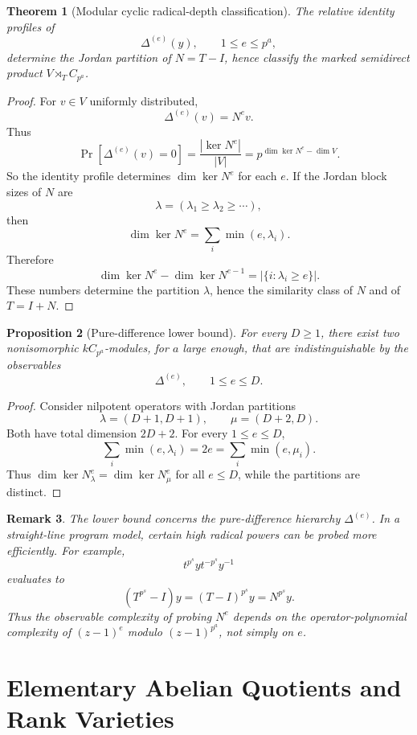 \documentclass[11pt]{article}
\newtheorem{theorem}{Theorem}[section]
\newtheorem{proposition}[theorem]{Proposition}
\newtheorem{remark}[theorem]{Remark}
\begin{document}
\begin{theorem}[Modular cyclic radical-depth classification]
The relative identity profiles of
\[
\Delta^{(e)}(y),
\qquad
1\le e\le p^a,
\]
determine the Jordan partition of $N=T-I$, hence classify the marked semidirect product $V\rtimes_T C_{p^a}$.
\end{theorem}

\begin{proof}
For $v\in V$ uniformly distributed,
\[
\Delta^{(e)}(v)=N^ev.
\]
Thus
\[
\Pr[\Delta^{(e)}(v)=0]
=
\frac{|\ker N^e|}{|V|}
=
p^{\dim\ker N^e-\dim V}.
\]
So the identity profile determines $\dim\ker N^e$ for each $e$. If the Jordan block sizes of $N$ are
\[
\lambda=(\lambda_1\ge \lambda_2\ge\cdots),
\]
then
\[
\dim\ker N^e=\sum_i \min(e,\lambda_i).
\]
Therefore
\[
\dim\ker N^e-\dim\ker N^{e-1}
=
|\{i:\lambda_i\ge e\}|.
\]
These numbers determine the partition $\lambda$, hence the similarity class of $N$ and of $T=I+N$.
\end{proof}

\begin{proposition}[Pure-difference lower bound]
For every $D\ge1$, there exist two nonisomorphic $kC_{p^a}$-modules, for $a$ large enough, that are indistinguishable by the observables
\[
\Delta^{(e)},\qquad 1\le e\le D.
\]
\end{proposition}

\begin{proof}
Consider nilpotent operators with Jordan partitions
\[
\lambda=(D+1,D+1),
\qquad
\mu=(D+2,D).
\]
Both have total dimension $2D+2$. For every $1\le e\le D$,
\[
\sum_i\min(e,\lambda_i)=2e=\sum_i\min(e,\mu_i).
\]
Thus $\dim\ker N_\lambda^e=\dim\ker N_\mu^e$ for all $e\le D$, while the partitions are distinct.
\end{proof}

\begin{remark}
The lower bound concerns the pure-difference hierarchy $\Delta^{(e)}$. In a straight-line program model, certain high radical powers can be probed more efficiently. For example,
\[
t^{p^s}yt^{-p^s}y^{-1}
\]
evaluates to
\[
(T^{p^s}-I)y=(T-I)^{p^s}y=N^{p^s}y.
\]
Thus the observable complexity of probing $N^e$ depends on the operator-polynomial complexity of $(z-1)^e$ modulo $(z-1)^{p^a}$, not simply on $e$.
\end{remark}

\section{Elementary Abelian Quotients and Rank Varieties}
\end{document}
